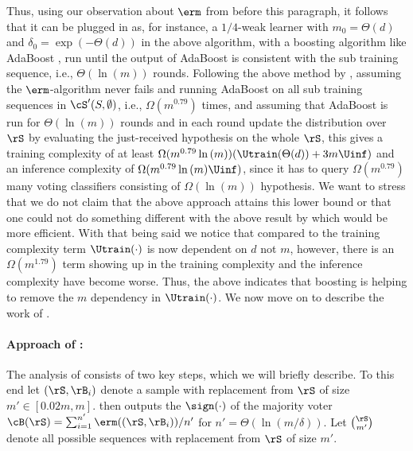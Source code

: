 Thus, using our observation about $ \erm $ from before this paragraph, it follows that it can be plugged in as, for instance, a $ 1/4 $-weak learner with $ m_{0}=\Theta(d) $ and $ \delta_{0}= \exp{\left(-\Theta(d) \right)}  $  in the above algorithm, with a boosting algorithm like AdaBoost \cite{Adaboost}, run until the output of AdaBoost is consistent with the sub training sequence, i.e., $ \Theta(\ln{\left(m \right)}) $ rounds. Following the above method by \citeauthor{Optimalweaktostronglearning}, assuming the $ \erm $-algorithm never fails and running AdaBoost on all sub training sequences in $\cS'(S,\emptyset) $, i.e., $ \Omega(m^{0.79}) $ times, and assuming that AdaBoost is run for $ \Theta(\ln(m)) $ rounds and in each round update the distribution over $ \rS $ by evaluating the just-received hypothesis on the whole $ \rS $, this gives a training complexity of at least $ \Omega(m^{0.79}\ln{\left(m \right)})(\Utrain(\Theta(d))+3m\Uinf) $ and an inference complexity of $\Omega( m^{0.79}\ln{(m )} \Uinf)$, since it has to query $ \Omega(m^{0.79})$ many voting classifiers consisting of $ \Omega(\ln{(m )}) $ hypothesis. We want to stress that we do not claim that the above approach attains this lower bound or that one could not do something different with the above result by \citeauthor{Optimalweaktostronglearning} which would be more efficient. With that being said we notice that compared to \cite{hannekeoptimal}  the training complexity term $ \Utrain(\cdot) $ is now dependent on $ d $ not $ m $, however, there is an $ \Omega(m^{1.79}) $ term showing up in the training complexity and the inference complexity have become worse. Thus, the above indicates that boosting is helping to remove the $ m $ dependency in $ \Utrain(\cdot) $. We now move on to describe the work of \cite{baggingoptimalPAClearner}.

\paragraph{Approach of \cite{baggingoptimalPAClearner}:}
The analysis of \cite{baggingoptimalPAClearner} consists of two key steps, which we will briefly describe. To this end let $(\rS,\rB_{i})$ denote a sample with replacement from $\rS$ of size $ m'\in[0.02m,m]$. \citeauthor{baggingoptimalPAClearner} then outputs the $ \sign(\cdot) $ of the majority voter $\cB(\rS)=\sum_{i=1}^{n'} \erm((\rS,\rB_{i}))/n'$ for $n'=\Theta(\ln{\left(m/\delta \right)})$. Let $\binom{\rS}{m'}$ denote all possible sequences with replacement from $\rS$ of size $m'$.  

